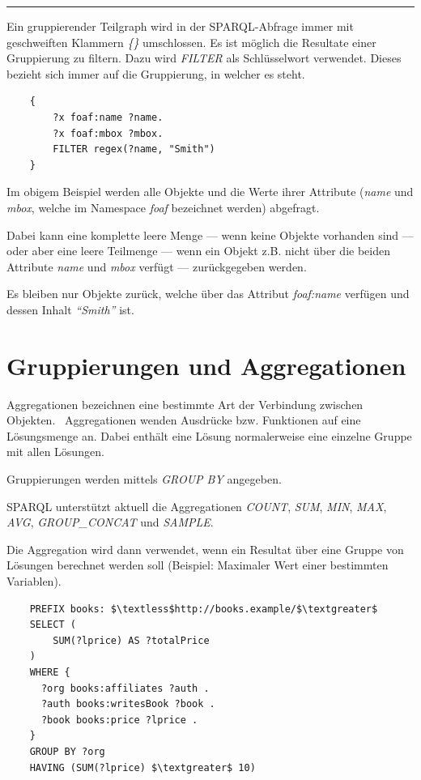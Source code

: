 \noindent\rule[1ex]{\textwidth}{1pt}

Ein gruppierender Teilgraph wird in der SPARQL-Abfrage immer mit geschweiften Klammern \textit{\{\}} umschlossen. Es ist möglich die Resultate einer Gruppierung zu filtern. Dazu wird \textit{FILTER} als Schlüsselwort verwendet. Dieses bezieht sich immer auf die Gruppierung, in welcher es steht.

\begin{lstlisting}
    {
        ?x foaf:name ?name.
        ?x foaf:mbox ?mbox.
        FILTER regex(?name, "Smith")
    }
\end{lstlisting}

Im obigem Beispiel werden alle Objekte und die Werte ihrer Attribute (\textit{name} und \textit{mbox}, welche im Namespace \textit{foaf} bezeichnet werden) abgefragt.

Dabei kann eine komplette leere Menge --- wenn keine Objekte vorhanden sind --- oder aber eine leere Teilmenge --- wenn ein Objekt z.B. nicht über die beiden Attribute \textit{name} und \textit{mbox} verfügt --- zurückgegeben werden.

Es bleiben nur Objekte zurück, welche über das Attribut \textit{foaf:name} verfügen und dessen Inhalt \textit{``Smith''} ist.

\section{Gruppierungen und Aggregationen}
\label{sec:sparql_gruppierungenaggregationen}
Aggregationen bezeichnen eine bestimmte Art der Verbindung zwischen Objekten.~\cite{wiki:aggregation} Aggregationen wenden Ausdrücke bzw. Funktionen auf eine Lösungsmenge an. Dabei enthält eine Lösung normalerweise eine einzelne Gruppe mit allen Lösungen.

Gruppierungen werden mittels \textit{GROUP BY} angegeben.

SPARQL unterstützt aktuell die Aggregationen \textit{COUNT}, \textit{SUM}, \textit{MIN}, \textit{MAX}, \textit{AVG}, \textit{GROUP\_CONCAT} und \textit{SAMPLE}.

Die Aggregation wird dann verwendet, wenn ein Resultat über eine Gruppe von Lösungen berechnet werden soll (Beispiel: Maximaler Wert einer bestimmten Variablen).

\lstset{language=SQL}
\begin{lstlisting}
    PREFIX books: $\textless$http://books.example/$\textgreater$
    SELECT (
        SUM(?lprice) AS ?totalPrice
    )
    WHERE {
      ?org books:affiliates ?auth .
      ?auth books:writesBook ?book .
      ?book books:price ?lprice .
    }
    GROUP BY ?org
    HAVING (SUM(?lprice) $\textgreater$ 10)
\end{lstlisting}
    
